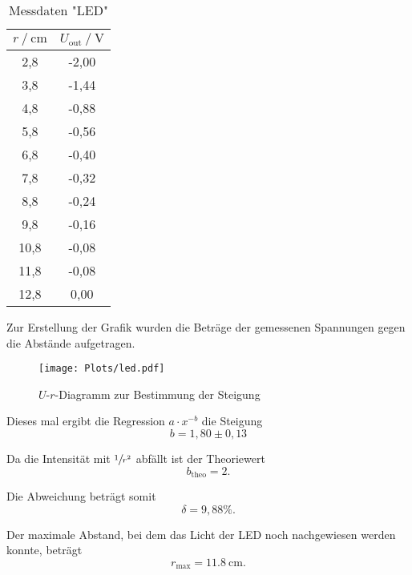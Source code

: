\begin{table}[H]
  \centering
  \caption{Messdaten "LED"}
  \label{tab:led}
  \begin{tabular}{S S}
    \toprule
      {$r \:/\: \mathrm{cm}$} & {$U_\text{out} \:/\: \mathrm{V}$} \\
    ,8  & 	-2,00    \\
    3,8	  &  -1,44  \\
    4,8	  &  -0,88  \\
    5,8	  &  -0,56  \\
    6,8	  &  -0,40  \\
    7,8	  &  -0,32  \\
    8,8	  &  -0,24  \\
    9,8	  &  -0,16  \\
    10,8  &  	-0,08  \\
    11,8  &  	-0,08  \\
    12,8  &  	0,00  \\
    \bottomrule
  \end{tabular}
\end{table}

Zur Erstellung der Grafik wurden die Beträge der gemessenen Spannungen gegen die Abstände aufgetragen.

\begin{figure}[H]
  \centering
  \texttt{[image: Plots/led.pdf]}
  \caption{$U$-$r$-Diagramm zur Bestimmung der Steigung}
  \label{fig:led}
\end{figure}

Dieses mal ergibt die Regression $a \cdot x^{-b}$ die Steigung
\begin{equation*}
  b = 1,80 \pm 0,13
\end{equation*}

Da die Intensität mit $\sfrac{1}{r^2}$ abfällt ist der Theoriewert
\begin{equation*}
  b_\text{theo} = 2.
\end{equation*}

Die Abweichung beträgt somit
\begin{equation*}
  \delta = 9,88 \%.
\end{equation*}

Der maximale Abstand, bei dem das Licht der LED noch nachgewiesen werden konnte, beträgt
\begin{equation*}
  r_\text{max} = \SI{11,8}{\cm}.
\end{equation*}
